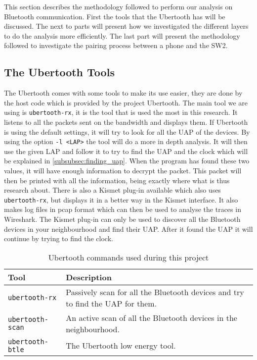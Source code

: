 This section describes the methodology followed to perform our analysis on Bluetooth communication. First the tools that the Ubertooth has will be discussed. The next to parts will present how we investigated the different layers to do the analysis more efficiently. The last part will present the methodology followed to investigate the pairing process between a phone and the SW2.

\subsection{The Ubertooth Tools}
\label{subsubsec:ubertooth_tools}
The Ubertooth comes with some tools to make its use easier, they are done by the host code which is provided by the project Ubertooth. 
The main tool we are using is \verb|ubertooth-rx|, it is the tool that is used the most in this research. It listens to all the packets sent on the bandwidth and displays them. If Ubertooth is using the default settings, it will try to look for all the UAP of the devices. By using the option \verb|-l <LAP>| the tool will do a more in depth analysis. It will then use the given LAP and follow it to try to find the UAP and the clock which will be explained in \ref{subsubsec:finding_uap}. When the program has found these two values, it will have enough information to decrypt the packet. This packet will then be printed with all the information, being exactly where what is thus research about. \pend There is also a Kismet plug-in available which also uses \verb|ubertooth-rx|, but displays it in a better way in the Kismet interface. It also makes log files in pcap format which can then be used to analyse the traces in Wireshark. The Kismet plug-in can only be used to discover all the Bluetooth devices in your neighbourhood and find their UAP. After it found the UAP it will continue by trying to find the clock.


\begin{table}[!h]
\begin{tabular}{|l|l|}
\hline
Tool & Description \\
\hline
\verb|ubertooth-rx| & Passively scan for all the Bluetooth devices and try to find the UAP for them. \\
\hline
\verb|ubertooth-scan| & An active scan of all the Bluetooth devices in the neighbourhood.  \\
\hline
\verb|ubertooth-btle| & The Ubertooth low energy tool. \\
\hline
\end{tabular}
\caption{Ubertooth commands used during this project}
\label{tab:ubertooth_tools}
\end{table}
\newpage
